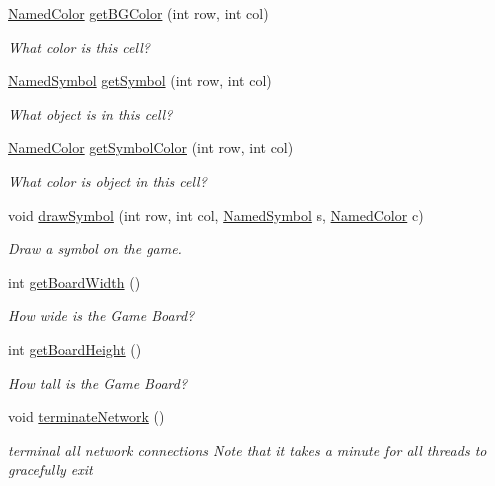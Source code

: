 \begin{DoxyCompactItemize}
\hyperlink{enumbridges_1_1base_1_1_named_color}{Named\+Color} \hyperlink{classbridges_1_1games_1_1_game_base_abe167e48f828be58d01ecb252afe6c7c}{get\+B\+G\+Color} (int row, int col)
\begin{DoxyCompactList}\small\item\em What color is this cell? \end{DoxyCompactList}\item 
\hyperlink{enumbridges_1_1base_1_1_named_symbol}{Named\+Symbol} \hyperlink{classbridges_1_1games_1_1_game_base_ade3cd7d7c3b317645a41ea93449c0f63}{get\+Symbol} (int row, int col)
\begin{DoxyCompactList}\small\item\em What object is in this cell? \end{DoxyCompactList}\item 
\hyperlink{enumbridges_1_1base_1_1_named_color}{Named\+Color} \hyperlink{classbridges_1_1games_1_1_game_base_a8a7782a6d1238ea3cbe26da9c04b2416}{get\+Symbol\+Color} (int row, int col)
\begin{DoxyCompactList}\small\item\em What color is object in this cell? \end{DoxyCompactList}\item 
void \hyperlink{classbridges_1_1games_1_1_game_base_a03e8446feb00d5957a7e160a4fa76342}{draw\+Symbol} (int row, int col, \hyperlink{enumbridges_1_1base_1_1_named_symbol}{Named\+Symbol} s, \hyperlink{enumbridges_1_1base_1_1_named_color}{Named\+Color} c)
\begin{DoxyCompactList}\small\item\em Draw a symbol on the game. \end{DoxyCompactList}\item 
int \hyperlink{classbridges_1_1games_1_1_game_base_a33018840a6f19eb54ef27e55231871f5}{get\+Board\+Width} ()
\begin{DoxyCompactList}\small\item\em How wide is the Game Board? \end{DoxyCompactList}\item 
int \hyperlink{classbridges_1_1games_1_1_game_base_a1effb2a789eb19eb81dec64f25be233e}{get\+Board\+Height} ()
\begin{DoxyCompactList}\small\item\em How tall is the Game Board? \end{DoxyCompactList}\item 
void \hyperlink{classbridges_1_1games_1_1_game_base_a3b0898cf9a8348245cd16382d670b486}{terminate\+Network} ()
\begin{DoxyCompactList}\small\item\em terminal all network connections Note that it takes a minute for all threads to gracefully exit \end{DoxyCompactList}\end{DoxyCompactItemize}
